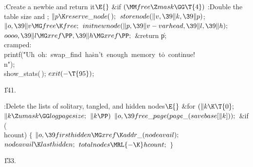 \B{}:Create a newbie and return it\X${}\E{}$\6
\&{if} ${}(\MM\\{free}\Z\\{mask}\GG\T{4}){}$\1\5
:Double the table size and \X;\2\6
${}\|p\K\\{reserve\_node}(\,);{}$\6
${}\\{storenode}(\|v,\39\|k,\39\|p){}$;\5
${}\|o,\39\|v\MG\\{free}\K\\{free};{}$\6
${}\\{initnewnode}(\|p,\39\|v-\\{varhead},\39\|l,\39\|h);{}$\6
${}\\{oooo},\39\|l\MG\\{xref}\PP,\39\|h\MG\\{xref}\PP;{}$\6
\&{return} \|p;\6
\4\\{cramped}:\5
\\{printf}(\.{"Uh\ oh:\ swap\_find\ ha}\)\.{sn't\ enough\ memory\ t}\)\.{o\
continue!\\n"});\6
\\{show\_stats}(\,);\6
${}\\{exit}({-}\T{95}){}$;\par
\U141.\fi

\B{}:Delete the lists of solitary, tangled, and hidden nodes\X${}%
\E{}$\6
\&{for} ${}(\|k\K\T{0};{}$ ${}\|k\Z\\{umask}\GG\\{logpagesize};{}$ ${}\|k%
\PP){}$\1\5
${}\|o,\39\\{free\_page}(\\{page\_}(\\{savebase}[\|k]));{}$\2\6
\&{if} (\\{hcount})\5
${}\{{}$\1\6
${}\|o,\39\\{firsthidden}\MG\\{xref}\K\\{addr\_}(\\{nodeavail});{}$\6
${}\\{nodeavail}\K\\{lasthidden};{}$\6
${}\\{totalnodes}\MRL{-{\K}}\\{hcount};{}$\6
\4${}\}{}$\2\par
\U133.\fi


